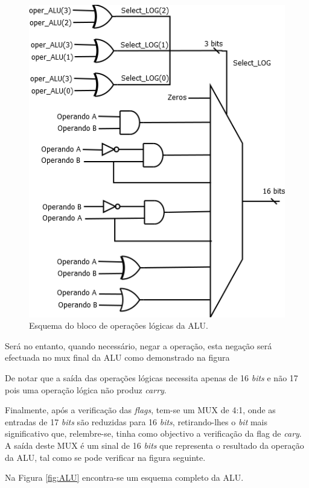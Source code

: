 \documentclass[11pt]{article}
\numberwithin{equation}{section}
\begin{document}
\vspace{1mm}

\begin{figure}[H]
	\centering
	\includegraphics[keepaspectratio=true, scale=0.40]{imagens/Log}
	\caption{Esquema do bloco de operações lógicas da ALU.}
	\vspace{-0.8em}
\end{figure}

Será no entanto, quando necessário, negar a operação, esta negação será efectuada no mux final da ALU como demonstrado na figura %

De notar que a saída das operações lógicas necessita apenas de 16 \textit{bits} e não 17 pois uma operação lógica não produz \textit{carry}.

Finalmente, após a verificação das \textit{flags}, tem-se um MUX de 4:1, onde as entradas de 17 \textit{bits} são reduzidas para 16 \textit{bits}, retirando-lhes o \textit{bit} mais significativo que, relembre-se, tinha como objectivo a verificação da flag de \textit{cary}. A saída deste MUX é um sinal de 16 \textit{bits} que representa o resultado da operação da ALU, tal como se pode verificar na figura seguinte.

Na Figura \ref{fig:ALU} encontra-se um esquema completo da ALU.
\end{document}
